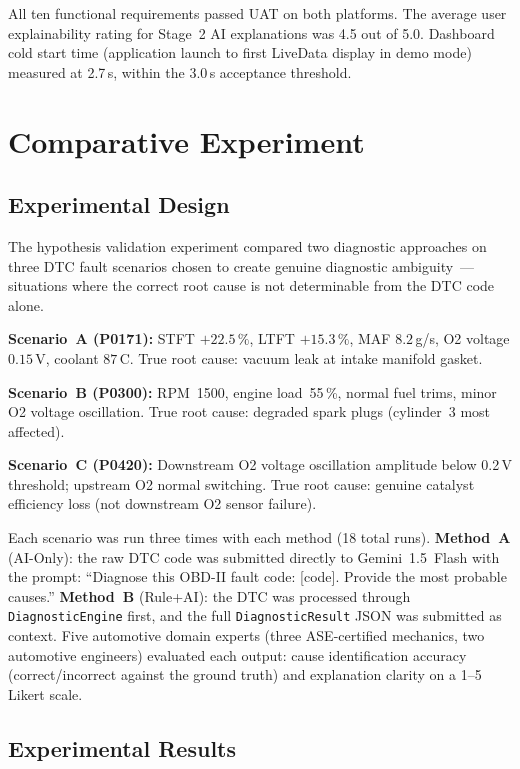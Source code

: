 All ten functional requirements passed UAT on both platforms.
The average user explainability rating for Stage~2 AI explanations was 4.5 out of 5.0.
Dashboard cold start time (application launch to first LiveData display in demo mode) measured at 2.7\,s, within the 3.0\,s acceptance threshold.

\section{Comparative Experiment}
\label{sec:experiment}

\subsection{Experimental Design}

The hypothesis validation experiment compared two diagnostic approaches on three DTC fault scenarios chosen to create genuine diagnostic ambiguity~--- situations where the correct root cause is not determinable from the DTC code alone.

\textbf{Scenario~A (P0171):}
STFT $+22.5\,\%$, LTFT $+15.3\,\%$, MAF $8.2$\,g/s, O2 voltage $0.15$\,V, coolant $87$\,\textdegree C.
True root cause: vacuum leak at intake manifold gasket.

\textbf{Scenario~B (P0300):}
RPM~1500, engine load~55\,\%, normal fuel trims, minor O2 voltage oscillation.
True root cause: degraded spark plugs (cylinder~3 most affected).

\textbf{Scenario~C (P0420):}
Downstream O2 voltage oscillation amplitude below 0.2\,V threshold; upstream O2 normal switching.
True root cause: genuine catalyst efficiency loss (not downstream O2 sensor failure).

Each scenario was run three times with each method (18 total runs).
\textbf{Method~A} (AI-Only): the raw DTC code was submitted directly to Gemini~1.5~Flash with the prompt: ``Diagnose this OBD-II fault code: [code]. Provide the most probable causes.''
\textbf{Method~B} (Rule+AI): the DTC was processed through \texttt{DiagnosticEngine} first, and the full \texttt{DiagnosticResult} JSON was submitted as context.
Five automotive domain experts (three ASE-certified mechanics, two automotive engineers) evaluated each output: cause identification accuracy (correct/incorrect against the ground truth) and explanation clarity on a 1--5 Likert scale.

\subsection{Experimental Results}

